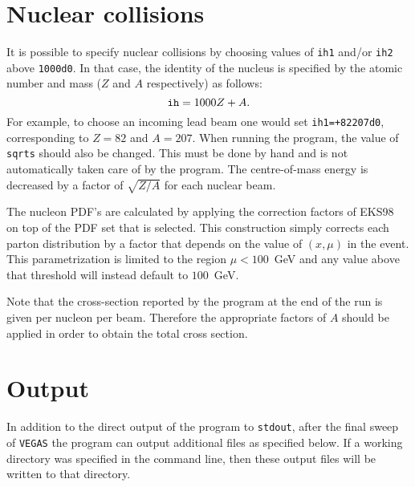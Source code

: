 \documentclass{article}
\begin{document}
\section{Nuclear collisions}
\label{sec:nucleus}

It is possible to specify nuclear collisions by choosing values
of {\tt ih1} and/or {\tt ih2} above {\tt 1000d0}. In that case,
the identity of the nucleus is specified by the atomic number
and mass ($Z$ and $A$ respectively) as follows:
\begin{equation}
{\tt ih} = 1000Z+A.
\end{equation}
For example, to choose an incoming lead beam one would set
{\tt ih1=+82207d0}, corresponding to $Z=82$ and $A=207$.
When running the program, the value of {\tt sqrts} should also be
changed. This must be done by hand and is not automatically taken
care of by the
program. The centre-of-mass energy is decreased by a factor of
$\sqrt{Z/A}$ for each nuclear beam. 

The nucleon PDF's are calculated by applying the correction
factors of EKS98~\cite{Eskola:1998df} on top of the PDF set that is selected.
This construction simply corrects each parton distribution by
a factor that depends on the value of $(x,\mu)$ in the event.
This parametrization is limited to the region $\mu < 100$~GeV and
any value above that threshold will instead default to $100$~GeV.

Note that the cross-section reported by the program at the end
of the run is given per nucleon per beam. Therefore the
appropriate factors of $A$ should be applied in order to obtain
the total cross section.

\section{Output}
\label{sec:output}

In addition to the direct output of the program to {\tt stdout}, after
the final sweep of {\tt VEGAS} the program can output additional files
as specified below.
If a working directory was specified in the command line, then these
output files will be written to that directory.
\end{document}
